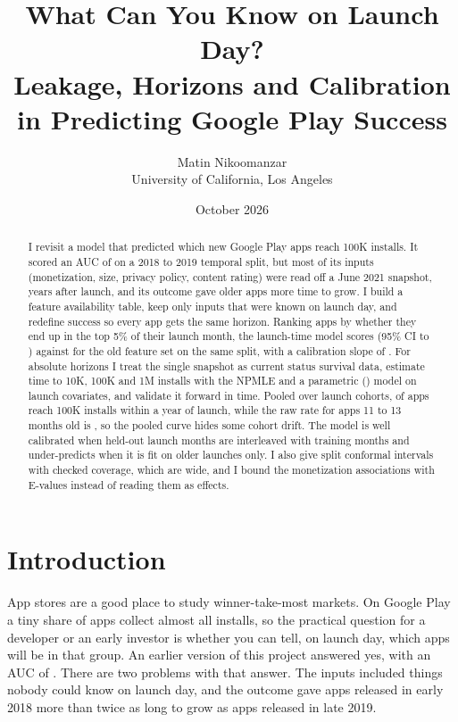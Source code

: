 \documentclass[11pt]{article}
\title{What Can You Know on Launch Day?\\[2pt]
\large Leakage, Horizons and Calibration in Predicting Google Play Success}
\author{Matin Nikoomanzar\\ University of California, Los Angeles}
\date{October 2026}
\begin{document}
\maketitle

\begin{abstract}
\noindent I revisit a model that predicted which new Google Play apps reach 100K installs. It scored an AUC of
\OldReportedAUC{} on a 2018 to 2019 temporal split, but most of its inputs (monetization, size, privacy policy,
content rating) were read off a June 2021 snapshot, years after launch, and its outcome gave older apps more time to
grow. I build a feature availability table, keep only inputs that were known on launch day, and redefine success so
every app gets the same horizon. Ranking apps by whether they end up in the top 5\% of their launch month, the
launch-time model scores \AUCLaunch{} (95\% CI \LoLaunch{} to \HiLaunch{}) against \AUCOld{} for the old feature
set on the same split, with a calibration slope of \SlopeLaunch{}. For absolute horizons I treat the single snapshot
as current status survival data, estimate time to 10K, 100K and 1M installs with the NPMLE and a parametric
(\Link{}) model on launch covariates, and validate it forward in time. Pooled over launch cohorts, \FHundredKTwelve{}
of apps reach 100K installs within a year of launch, while the raw rate for apps 11 to 13 months old is
\RawHundredK{}, so the pooled curve hides some cohort drift. The model is well calibrated when held-out launch months
are interleaved with training months and under-predicts when it is fit on older launches only. I also give split
conformal intervals with checked coverage, which are wide, and I bound the monetization associations with E-values
instead of reading them as effects.
\end{abstract}

\section{Introduction}

App stores are a good place to study winner-take-most markets. On Google Play a tiny share of apps collect almost
all installs, so the practical question for a developer or an early investor is whether you can tell, on launch day,
which apps will be in that group. An earlier version of this project answered yes, with an AUC of \OldReportedAUC{}.
There are two problems with that answer. The inputs included things nobody could know on launch day, and the
outcome gave apps released in early 2018 more than twice as long to grow as apps released in late 2019.
\end{document}
